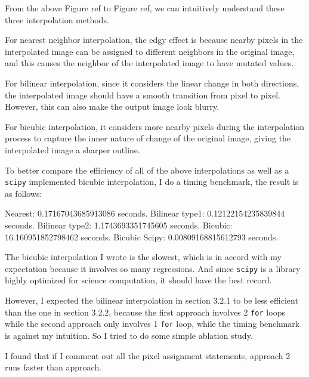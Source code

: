 \documentclass[
]{article}
\newenvironment{Shaded}{}{}
\newcommand{\FloatTok}[1]{\textcolor[rgb]{0.25,0.63,0.44}{#1}}
\newcommand{\NormalTok}[1]{#1}
\begin{document}
From the above Figure ref to Figure ref, we can intuitively understand
these three interpolation methods.

For nearest neighbor interpolation, the edgy effect is because nearby
pixels in the interpolated image can be assigned to different neighbors
in the original image, and this causes the neighbor of the interpolated
image to have mutated values.

For bilinear interpolation, since it considers the linear change in both
directions, the interpolated image should have a smooth transition from
pixel to pixel. However, this can also make the output image look
blurry.

For bicubic interpolation, it considers more nearby pixels during the
interpolation process to capture the inner nature of change of the
original image, giving the interpolated image a sharper outline.

To better compare the efficiency of all of the above interpolations as
well as a \texttt{scipy} implemented bicubic interpolation, I do a
timing benchmark, the result is as follows:

\begin{Shaded}
\begin{Highlighting}[]
\NormalTok{Nearest: }\FloatTok{0.17167043685913086}\NormalTok{ seconds.}
\NormalTok{Bilinear type1: }\FloatTok{0.12122154235839844}\NormalTok{ seconds.}
\NormalTok{Bilinear type2: }\FloatTok{1.1743693351745605}\NormalTok{ seconds.}
\NormalTok{Bicubic: }\FloatTok{16.160951852798462}\NormalTok{ seconds.}
\NormalTok{Bicubic Scipy: }\FloatTok{0.00809168815612793}\NormalTok{ seconds.}
\end{Highlighting}
\end{Shaded}

The bicubic interpolation I wrote is the slowest, which is in accord
with my expectation because it involves so many regressions. And since
\texttt{scipy} is a library highly optimized for science computation, it
should have the best record.

However, I expected the bilinear interpolation in section 3.2.1 to be
less efficient than the one in section 3.2.2, because the first approach
involves 2 \texttt{for} loops while the second approach only involves 1
\texttt{for} loop, while the timing benchmark is against my intuition.
So I tried to do some simple ablation study.

I found that if I comment out all the pixel assignment statements,
approach 2 runs faster than approach.
\end{document}
